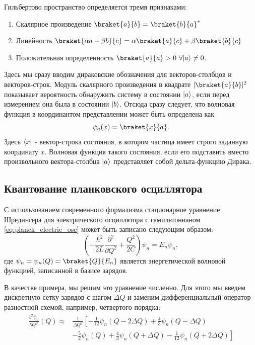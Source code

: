 \documentclass[14pt, a4paper]{extreport}
\DeclarePairedDelimiter\bra{\langle}{\rvert}
\DeclarePairedDelimiter\ket{\lvert}{\rangle}
\numberwithin{equation}{section}
\begin{document}
Гильбертово пространство определяется тремя признаками:
\begin{enumerate}
	\item Скалярное произведение $\braket{a}{b} = \braket{b}{a}^*$
	\item Линейность $\braket{\alpha a + \beta b}{c} = \alpha\braket{a}{c} + \beta\braket{b}{c}$
	\item Положительная определенность $ \braket{a}{a} >0 \  \forall \ket{a} \neq 0$. 
\end{enumerate}

Здесь мы сразу вводим дираковские обозначения для векторов-столбцов и векторов-строк. Модуль скалярного произведения в квадрате $|\braket{a}{b}|^2$ показывает вероятность обнаружить систему в состоянии $\ket{a}$, если перед измерением она была в состоянии $\ket{b}$. Отсюда сразу следует, что волновая функция в координантом представлении может быть определена как
\begin{equation}
	\psi_a(x) = \braket{x}{a}.
\end{equation}
Здесь $\bra{x}$ - вектор-строка состояния, в котором частица имеет строго заданную координату $x$. Волновая функция такого состояния, если его подставить вместо произвольного вектора-столбца $\ket{a}$ представляет собой дельта-функцию Дирака.

\subsection{Квантование планковского осциллятора}

С использованием современного формализма стационарное уравнение Шредингера для электрического осциллятора с гамильтонианом \eqref{eq:planck_electric_osc} может быть записано следующим образом:
\begin{equation}
	\left(-\frac{\hbar^2}{2 L} \frac{\partial^2 }{\partial Q^2} + \frac{Q^2}{2 C}\right)\psi_n = E_n \psi_n,\label{eq:shroedinger_planck}
\end{equation}
где $\psi_n = \psi_n(Q) = \braket{Q}{E_n}$ является энергетической волновой функцией, записанной в базисе зарядов. 

В качестве примера, мы решим это уравнение численно. Для этого мы введем дискретную сетку зарядов с шагом $\Delta Q$ и заменим дифференциальный оператор разностной схемой, например, четвертого порядка:
\begin{equation}
\begin{aligned}
	\frac{\partial^2 \psi_n}{\partial Q^2}(Q) \approx &\frac{1}{\Delta Q^2}\left[-\frac{1}{12} \psi_n(Q - 2 \Delta Q)
+\frac{4}{3} \psi_n(Q - \Delta Q)\right.\\
&\left.-\frac{5}{2} \psi_n(Q)
+\frac{4}{3} \psi_n(Q + \Delta Q)
-\frac{1}{12} \psi_n(Q + 2 \Delta Q)\right]
\end{aligned}
\end{equation}
\end{document}
